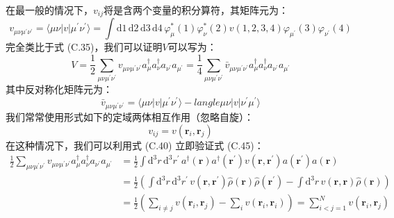 在最一般的情况下，$v_{ij}$将是含两个变量的积分算符，其矩阵元为：
\begin{equation}
v_{\mu\nu\mu^{\prime}\nu^{\prime}}=\langle\mu\nu|v|\mu^{\prime}\nu^{\prime}\rangle=\int\mathrm{d}1\,\mathrm{d}2\,\mathrm{d}3\,\mathrm{d}4\,\varphi^{*}_{\mu}(1)\varphi^{*}_{\nu}(2)v(1,2,3,4)\varphi_{\mu^{\prime}}(3)\varphi_{\nu^{\prime}}(4)\label{eq:appendix_c_v_matrix_el}
\end{equation}
完全类比于式 (C.35)，我们可以证明$V$可以写为：
\begin{equation}
V=\frac{1}{2}\sum_{\mu\nu\mu^{\prime}\nu^{\prime}}v_{\mu\nu\mu^{\prime}\nu^{\prime}}a^{\dagger}_{\mu}a^{\dagger}_{\nu}a_{\nu^{\prime}}a_{\mu^{\prime}}=\frac{1}{4}\sum_{\mu\nu\mu^{\prime}\nu^{\prime}}\bar{v}_{\mu\nu\mu^{\prime}\nu^{\prime}}a^{\dagger}_{\mu}a^{\dagger}_{\nu}a_{\nu^{\prime}}a_{\mu^{\prime}}\label{eq:appendix_c_two_body_second_quant}
\end{equation}
其中反对称化矩阵元为：
\begin{equation}
\bar{v}_{\mu\nu\mu^{\prime}\nu^{\prime}}=\langle\mu\nu|v|\mu^{\prime}\nu^{\prime}\rangle-langle\mu\nu|v|\nu^{\prime}\mu^{\prime}\rangle\label{eq:appendix_c_v_antisymm}
\end{equation}
我们常常使用形式如下的定域两体相互作用（忽略自旋）：
\begin{equation}
v_{ij}=v(\boldsymbol{r}_{i},\boldsymbol{r}_{j})\label{eq:appendix_c_local_two_body}
\end{equation}
在这种情况下，我们可以利用式 (C.40) 立即验证式 (C.45)：
\begin{align}
\frac{1}{2}\sum_{\mu\nu\mu^{\prime}\nu^{\prime}}v_{\mu\nu\mu^{\prime}\nu^{\prime}}a^{\dagger}_{\mu}a^{\dagger}_{\nu}a_{\nu^{\prime}}a_{\mu^{\prime}} & =\frac{1}{2}\int\mathrm{d}^{3}r\,\mathrm{d}^{3}r^{\prime}\,a^{\dagger}(\boldsymbol{r})a^{\dagger}(\boldsymbol{r}^{\prime})v(\boldsymbol{r},\boldsymbol{r}^{\prime})a(\boldsymbol{r}^{\prime})a(\boldsymbol{r})\nonumber \\
 & =\frac{1}{2}\left(\int\mathrm{d}^{3}r\,\mathrm{d}^{3}r^{\prime}\,v(\boldsymbol{r},\boldsymbol{r}^{\prime})\hat{\rho}(\boldsymbol{r})\hat{\rho}(\boldsymbol{r}^{\prime})-\int\mathrm{d}^{3}r\,v(\boldsymbol{r},\boldsymbol{r})\hat{\rho}(\boldsymbol{r})\right)\nonumber \\
 & =\frac{1}{2}\left(\sum_{i\neq j}v(\boldsymbol{r}_{i},\boldsymbol{r}_{j})-\sum_{i}v(\boldsymbol{r}_{i},\boldsymbol{r}_{i})\right)=\sum^{N}_{i<j=1}v(\boldsymbol{r}_{i},\boldsymbol{r}_{j})\label{eq:appendix_c_local_two_body_verify}
\end{align}


